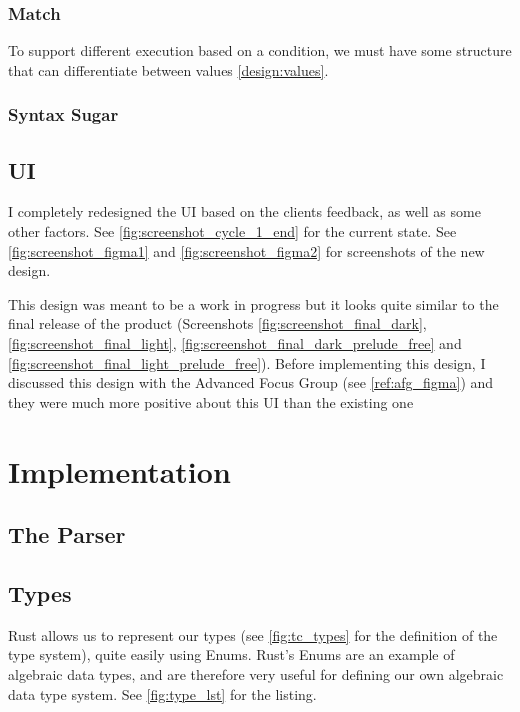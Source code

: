 \subsubsection{Match}
To support different execution based on a condition, we must have some structure that can differentiate between values \ref{design:values}. 

\subsubsection{Syntax Sugar}

\subsection{UI}
I completely redesigned the UI based on the clients feedback, as well as some other factors. See \ref{fig:screenshot_cycle_1_end} for the current state. See \ref{fig:screenshot_figma1} and \ref{fig:screenshot_figma2} for screenshots of the new design. 

This design was meant to be a work in progress but it looks quite similar to the final release of the product (Screenshots \ref{fig:screenshot_final_dark}, \ref{fig:screenshot_final_light}, \ref{fig:screenshot_final_dark_prelude_free} and \ref{fig:screenshot_final_light_prelude_free}). Before implementing this design, I discussed this design with the Advanced Focus Group (see \ref{ref:afg_figma}) and they were much more positive about this UI than the existing one 

\section{Implementation}
\subsection{The Parser}

\subsection{Types}

Rust allows us to represent our types (see \ref{fig:tc_types} for the definition of the type system), quite easily using Enums. Rust's Enums are an example of algebraic data types, and are therefore very useful for defining our own algebraic data type system. See \ref{fig:type_lst} for the listing. 

